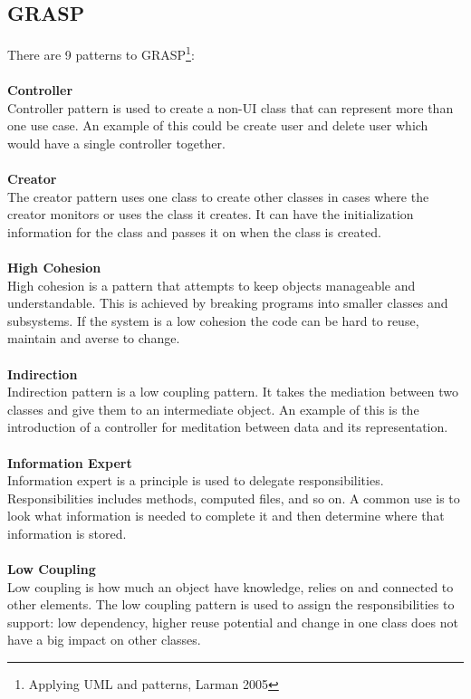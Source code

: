 \subsection{GRASP}
\label{appendix:GRASP}
There are 9 patterns to GRASP\footnote{Applying UML and patterns, Larman 2005}:
\\
\\
\textbf{Controller}
\\
Controller pattern is used to create a non-UI class that can represent more than one use case. An example of this could be create user and delete user which would have a single controller together.
\\
\\
\textbf{Creator}
\\
The creator pattern uses one class to create other classes in cases where the creator monitors or uses the class it creates. It can have the initialization information for the class and passes it on when the class is created.
\\
\\
\textbf{High Cohesion}
\\
High cohesion is a pattern that attempts to keep objects manageable and understandable. This is achieved by breaking programs into smaller classes and subsystems. If the system is a low cohesion the code can be hard to reuse, maintain and averse to change.
\\
\\
\textbf{Indirection}
\\
Indirection pattern is a low coupling pattern. It takes the mediation between two classes and give them to an intermediate object. An example of this is the introduction of a controller for meditation between data and its representation.
\\
\\
\textbf{Information Expert}
\\
Information expert is a principle is used to delegate responsibilities. Responsibilities includes methods, computed files, and so on. A common use is to look what information is needed to complete it and then determine where that information is stored.
\\
\\
\textbf{Low Coupling}
\\
Low coupling is how much an object have knowledge, relies on and connected to other elements. The low coupling pattern is used to assign the responsibilities to support: low dependency, higher reuse potential and change in one class does not have a big impact on other classes.
